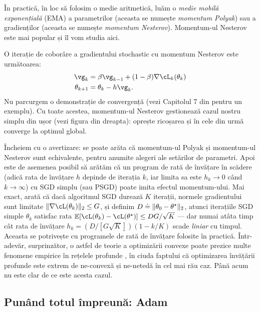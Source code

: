 \documentclass[../../book-main_ro.tex]{subfiles}
\begin{document}
În practică, în loc să folosim o medie aritmetică, luăm o \textit{medie mobilă exponențială} (EMA) a parametrilor (aceasta se numește \textit{momentum Polyak}) sau a gradienților (aceasta se numește \textit{momentum Nesterov}). Momentum-ul Nesterov este mai popular și îl vom studia aici.

O iterație de coborâre a gradientului stochastic cu momentum Nesterov este următoarea:
\begin{align}
    \vg_{k}
    &= \beta\vg_{k - 1} + (1 - \beta)\nabla \cL_{k}(\theta_{k}) \\ 
    \theta_{k + 1}
    &= \theta_{k} - h\vg_{k}.
\end{align}
Nu parcurgem o demonstrație de convergență (vezi Capitolul 7 din \cite{garrigos2023handbook} pentru un exemplu). Cu toate acestea, momentum-ul Nesterov gestionează cazul nostru simplu din  ușor (vezi figura din dreapta): oprește ricoșarea și în cele din urmă converge la optimul global.

Încheiem cu o avertizare: se poate arăta că momentum-ul Polyak și momentum-ul Nesterov sunt echivalente, pentru anumite alegeri ale setărilor de parametri. Apoi este de asemenea posibil să arătăm că un program de rată de învățare în scădere (adică rata de învățare \(h\) depinde de iterația \(k\), iar limita sa este \(h_{k} \to 0\) când \(k \to \infty\)) cu SGD simplu (sau PSGD) poate imita efectul momentum-ului. Mai exact, \cite{defazio2023optimal} arată că dacă algoritmul SGD durează \(K\) iterații, normele gradientului sunt limitate \(\norm{\nabla \cL(\theta_{k})}_{2} \leq G\), și definim \(D \doteq \norm{\theta_{0} - \theta^{\star}}_{2}\), atunci iterațiile SGD simple \(\theta_{k}\) satisfac rata \(\Ex[\cL(\theta_{k}) - \cL(\theta^{\star})] \leq DG/\sqrt{K}\) --- dar numai atâta timp cât rata de învățare \(h_{k} = (D/[G\sqrt{K}])(1 - k/K)\) scade \textit{liniar} cu timpul. Aceasta se potrivește cu programele de rată de învățare folosite în practică. Într-adevăr, surprinzător, o astfel de teorie a optimizării convexe poate prezice multe fenomene empirice în rețelele profunde \cite{schaipp2025surprising}, în ciuda faptului că optimizarea învățării profunde este extrem de ne-convexă și ne-netedă în cel mai rău caz. Până acum nu este clar de ce este acesta cazul.


\subsection{Punând totul împreună: Adam}
\end{document}
